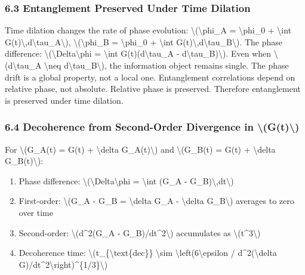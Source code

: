\documentclass[
  10pt,
]{article}
\providecommand{\tightlist}{%
  \setlength{\itemsep}{0pt}\setlength{\parskip}{0pt}}
\begin{document}
\hypertarget{entanglement-preserved-under-time-dilation}{%
\subsubsection{6.3 Entanglement Preserved Under Time
Dilation}\label{entanglement-preserved-under-time-dilation}}

Time dilation changes the rate of phase evolution:
\textbackslash(\textbackslash phi\_A = \textbackslash phi\_0 +
\textbackslash int
G(t)\textbackslash,d\textbackslash tau\_A\textbackslash),
\textbackslash(\textbackslash phi\_B = \textbackslash phi\_0 +
\textbackslash int
G(t)\textbackslash,d\textbackslash tau\_B\textbackslash). The phase
difference: \textbackslash(\textbackslash Delta\textbackslash phi =
\textbackslash int G(t)(d\textbackslash tau\_A -
d\textbackslash tau\_B)\textbackslash). Even when
\textbackslash(d\textbackslash tau\_A \textbackslash neq
d\textbackslash tau\_B\textbackslash), the information object remains
single. The phase drift is a global property, not a local one.
Entanglement correlations depend on relative phase, not absolute.
Relative phase is preserved. Therefore entanglement is preserved under
time dilation.

\hypertarget{decoherence-from-second-order-divergence-in-gt}{%
\subsubsection{6.4 Decoherence from Second-Order Divergence in
\textbackslash(G(t)\textbackslash)}\label{decoherence-from-second-order-divergence-in-gt}}

For \textbackslash(G\_A(t) = G(t) + \textbackslash delta
G\_A(t)\textbackslash) and \textbackslash(G\_B(t) = G(t) +
\textbackslash delta G\_B(t)\textbackslash):

\begin{enumerate}
\tightlist
\item
  Phase difference:
  \textbackslash(\textbackslash Delta\textbackslash phi =
  \textbackslash int (G\_A - G\_B)\textbackslash,dt\textbackslash)
\item
  First-order: \textbackslash(G\_A - G\_B = \textbackslash delta G\_A -
  \textbackslash delta G\_B\textbackslash) averages to zero over time
\item
  Second-order: \textbackslash(d\^{}2(G\_A -
  G\_B)/dt\^{}2\textbackslash) accumulates as
  \textbackslash(t\^{}3\textbackslash)
\item
  Decoherence time: \textbackslash(t\_\{\textbackslash text\{dec\}\}
  \textbackslash sim \textbackslash left(6\textbackslash epsilon /
  \textbar d\^{}2(\textbackslash delta
  G)/dt\^{}2\textbar\textbackslash right)\^{}\{1/3\}\textbackslash)
\end{enumerate}
\end{document}
